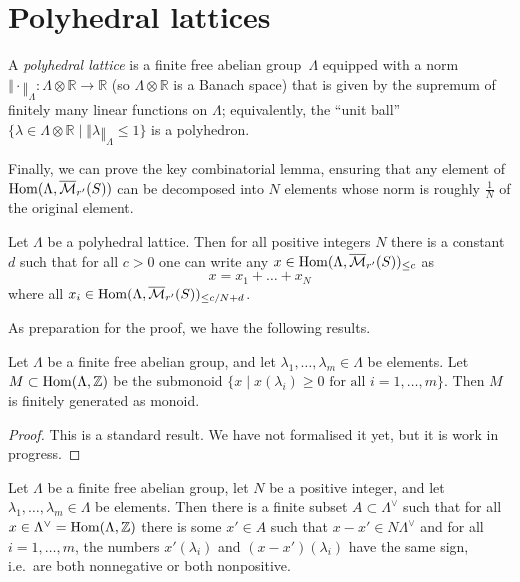 \section{Polyhedral lattices}

\begin{definition}
  \label{polyhedral_lattice}
  A \emph{polyhedral lattice} is a finite free abelian group~$\Lambda$
  equipped with a norm $‖\cdot‖_\Lambda \colon \Lambda\otimes \mathbb R\to \mathbb R$
  (so $\Lambda\otimes \mathbb R$ is a Banach space)
  that is given by the supremum of finitely many linear functions on $\Lambda$;
  equivalently, the ``unit ball''
  $\{\lambda\in \Lambda\otimes \mathbb R\mid ‖\lambda‖_\Lambda\leq 1\}$ is a polyhedron.
\end{definition}

Finally, we can prove the key combinatorial lemma,
ensuring that any element of $\operatorname{Hom}(\Lambda,\overline{\mathcal M}_{r'}(S))$
can be decomposed into $N$ elements whose norm is roughly $\tfrac 1N$ of the original element.

\begin{lemma}
  \label{combi}
  \leanok
  Let $\Lambda$ be a polyhedral lattice.
  Then for all positive integers $N$ there is a constant $d$
  such that for all $c>0$ one can write any
  $x\in \operatorname{Hom}(\Lambda,\overline{\mathcal M}_{r'}(S))_{\leq c}$ as
  \[
    x=x_1+\ldots+x_N
  \]
  where all $x_i\in \operatorname{Hom}(\Lambda,\overline{\mathcal M}_{r'}(S))_{\leq c/N+d}$.
\end{lemma}

As preparation for the proof, we have the following results.

\begin{lemma}
  \label{explicit_gordan}
  \leanok
  Let $\Lambda$ be a finite free abelian group,
  and let $\lambda_1, \ldots, \lambda_m \in \Lambda$ be elements.
  Let $M \subset \operatorname{Hom}(\Lambda, \mathbb Z)$ be the submonoid
  $\{x \mid x(\lambda_i) \ge 0 \text{ for all $i = 1, \dots, m$}\}$.
  Then $M$ is finitely generated as monoid.
\end{lemma}

\begin{proof}
  This is a standard result.
  We have not formalised it yet, but it is work in progress.
\end{proof}

\begin{lemma}
  \label{combi_aux}
  \leanok
  Let $\Lambda$ be a finite free abelian group,
  let $N$ be a positive integer,
  and let $\lambda_1,\ldots,\lambda_m\in \Lambda$ be elements.
  Then there is a finite subset $A\subset \Lambda^\vee$
  such that for all $x\in \Lambda^\vee=\operatorname{Hom}(\Lambda,\mathbb Z)$
  there is some $x'\in A$ such that $x-x'\in N\Lambda^\vee$
  and for all $i=1,\ldots,m$,
  the numbers $x'(\lambda_i)$ and $(x-x')(\lambda_i)$ have the same sign,
  i.e.~are both nonnegative or both nonpositive.
\end{lemma}

